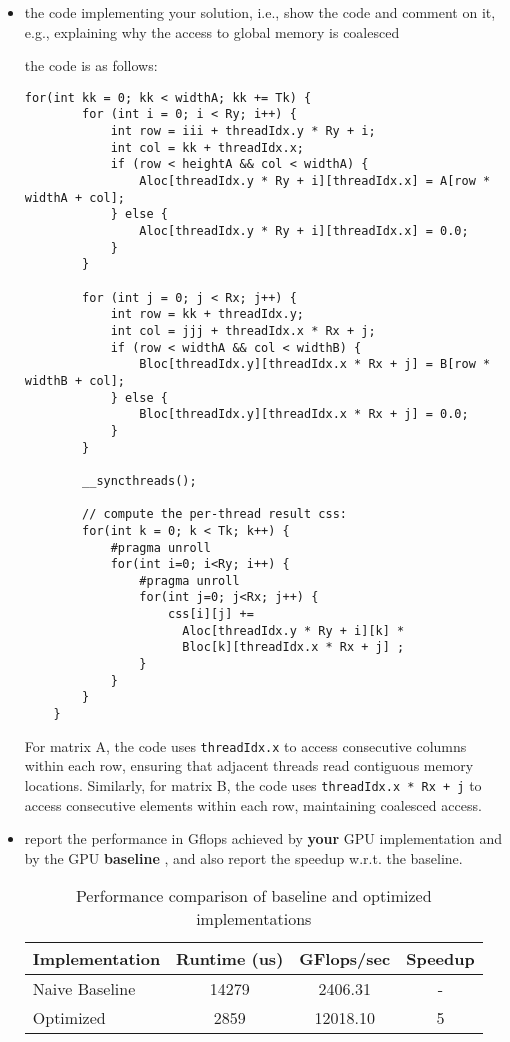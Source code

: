 \documentclass{article}
\begin{document}
\begin{itemize}
    \item the code implementing your solution, i.e., show the code and comment on it,
    e.g., explaining why the access to global memory is coalesced

    the code is as follows:

    \begin{lstlisting}[language=cuda]
    for(int kk = 0; kk < widthA; kk += Tk) {
        for (int i = 0; i < Ry; i++) {
            int row = iii + threadIdx.y * Ry + i;
            int col = kk + threadIdx.x;
            if (row < heightA && col < widthA) {
                Aloc[threadIdx.y * Ry + i][threadIdx.x] = A[row * widthA + col];
            } else {
                Aloc[threadIdx.y * Ry + i][threadIdx.x] = 0.0;
            }
        }
  
        for (int j = 0; j < Rx; j++) {
            int row = kk + threadIdx.y;
            int col = jjj + threadIdx.x * Rx + j;
            if (row < widthA && col < widthB) {
                Bloc[threadIdx.y][threadIdx.x * Rx + j] = B[row * widthB + col];
            } else {
                Bloc[threadIdx.y][threadIdx.x * Rx + j] = 0.0;
            }
        }
  
        __syncthreads();
  
        // compute the per-thread result css:
        for(int k = 0; k < Tk; k++) {
            #pragma unroll
            for(int i=0; i<Ry; i++) {
                #pragma unroll
                for(int j=0; j<Rx; j++) {
                    css[i][j] +=  
                      Aloc[threadIdx.y * Ry + i][k] *
                      Bloc[k][threadIdx.x * Rx + j] ;
                }
            }
        }
    }
    \end{lstlisting}

    For matrix A, the code uses \texttt{threadIdx.x} to access consecutive columns within each row, ensuring that adjacent threads read contiguous memory locations. 
    Similarly, for matrix B, the code uses \texttt{threadIdx.x * Rx + j} to access consecutive elements within each row, maintaining coalesced access. 
    
    \item report the performance in Gflops achieved by \textbf{your} GPU implementation
    and by the GPU \textbf{baseline} , and also report the speedup w.r.t. the
    baseline.

    
    \begin{table}[h]
        \centering
        \begin{tabular}{|l|c|c|c|}
        \hline
        \textbf{Implementation} & \textbf{Runtime (us)} & \textbf{GFlops/sec} & \textbf{Speedup} \\
        \hline
        Naive Baseline & 14279 & 2406.31 & -\\
        Optimized & 2859 & 12018.10 & 5 \\
        \hline
        \end{tabular}
        \caption{Performance comparison of baseline and optimized implementations}
        \label{tab:performance-comparison}
    \end{table}


\end{itemize}
\end{document}

